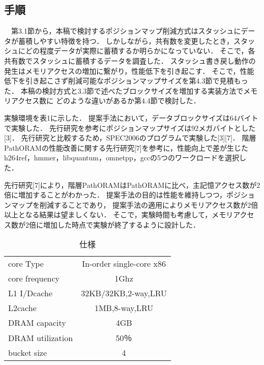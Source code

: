 \documentclass{jarticle}
\begin{document}
\subsection{手順}
　第3.1節から，本稿で検討するポジションマップ削減方式はスタッシュにデータが蓄積しやすい特徴を持つ．
しかしながら，共有数を変更したとき，スタッシュにどの程度データが実際に蓄積するか明らかになっていない．
そこで，各共有数でスタッシュに蓄積するデータを調査した．
スタッシュ書き戻し動作の発生はメモリアクセスの増加に繋がり，性能低下を引き起こす．
そこで，性能低下を引き起こさず削減可能なポジションマップサイズを第4.3節で見積もった．
本稿の検討方式と3.3節で述べたブロックサイズを増加する実装方法でメモリアクセス数に
どのような違いがあるか第4.4節で検討した．

 実験環境を表1に示した．
 提案手法において，データブロックサイズは64バイトで実験した．
 先行研究を参考にポジションマップサイズは92メガバイトとした[3]．
 先行研究と比較するため，SPEC2006のプログラムで実験した[3][7]．
 階層PathORAMの性能改善に関する先行研究[7]を参考に，性能向上で差が生じたh264ref，hmmer，libquantum，omnetpp，gccの5つのワークロードを選択した．
 
 先行研究[7]により，階層PathORAMはPathORAMに比べ，主記憶アクセス数が2倍に増加することがわかった．
提案手法の目的は性能を維持しつつ，ポジションマップを削減することであり，
提案手法の適用によりメモリアクセス数が2倍以上となる結果は望ましくない．
そこで，実験時間も考慮して，メモリアクセス数が2倍に増加した時点で実験が終了するように設計した．


\begin{small}
\begin{table}
  \centering
    \caption{仕様}
    \begin{tabular}{|l|c|} \hline
      core Type & In-order single-core x86 \\
      core frequency & 1Ghz \\
      L1 I/Dcache & 32KB/32KB,2-way,LRU \\
      L2cache & 1MB,8-way,LRU \\
      DRAM capacity & 4GB \\
      DRAM utilization & 50％ \\
      bucket size & 4 \\ \hline
    \end{tabular}
    \label{tab:const}
\end{table}
\end{small}
\end{document}
